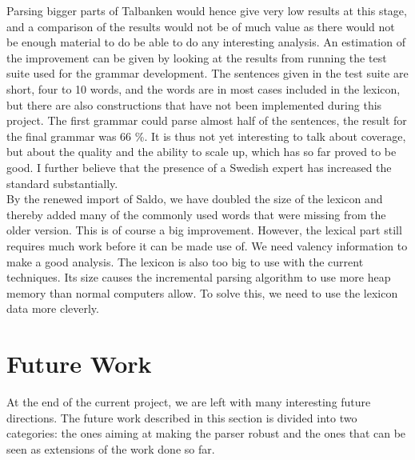 \documentclass{report}
\begin{document}
Parsing bigger parts of Talbanken would hence give very low results at this stage, 
and a comparison of the results would not be of much value as
there would not be enough material %
to do be able to do any interesting analysis.
An estimation of the improvement can be given by looking at the results from
running the test suite used for the grammar development.
The sentences given in the test suite are short, four to 10 words, and the
words are in most cases included in
the lexicon, but there are also constructions that have not been implemented 
during this project.
The first grammar could parse almost half of the sentences, the result for the final
grammar was 66 \%. 
It is thus not yet interesting to talk about coverage, but about the quality and
the ability to scale up, which has so far proved to be good.
I further believe that the presence of a Swedish expert has
increased the standard substantially.\\


By the renewed import of Saldo, we have doubled the size of the lexicon and thereby
added many of the commonly used words that were missing from the older
version. This is of course a big improvement.
However, the lexical part still requires much work before it can be made use of.
We need valency information to make a good analysis. The lexicon is also too
big to use with the current techniques. Its size causes the
incremental parsing algorithm to use more heap memory than normal computers
allow. To solve this, we need to use the lexicon data more cleverly.

%
%

\section{Future Work}
\label{sec:future}
At the end of the current project,
we are left with 
many interesting future directions.
The future work described in this section is divided into two categories:
the ones aiming at making the parser robust and the ones that can be
seen as extensions of the work done so far.
 
\end{document}
